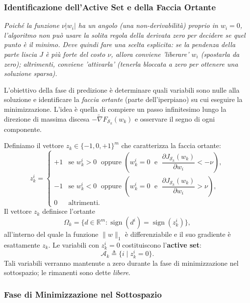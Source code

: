 \documentclass[a4paper,12pt]{article}
\numberwithin{equation}{section}
\numberwithin{figure}{section}
\numberwithin{table}{section}
\begin{document}
\subsubsection{Identificazione dell'Active Set e della Faccia Ortante}
\textit{Poiché la funzione \(\nu|w_i|\) ha un angolo (una non-derivabilità) proprio in \(w_i = 0\), l'algoritmo non può usare la solita regola della derivata zero per decidere se quel punto è il minimo. Deve quindi fare una scelta esplicita: se la pendenza della parte liscia \(J\) è più forte del costo \(\nu\), allora conviene 'liberare' \(w_i\) (spostarla da zero); altrimenti, conviene 'attivarla' (tenerla bloccata a zero per ottenere una soluzione sparsa).}

L'obiettivo della fase di predizione è determinare quali variabili sono nulle
alla soluzione e identificare la \emph{faccia ortante} (parte dell'iperpiano) su cui eseguire la
minimizzazione. L'idea è quella di compiere un passo infinitesimo lungo la
direzione di massima discesa $-\widetilde{\nabla}F_{\mathcal{S}_k}(w_k)$ e
osservare il segno di ogni componente.

Definiamo il vettore $z_k \in \{-1,0,+1\}^m$ che caratterizza la faccia ortante:
\begin{equation}
z_k^i =
\begin{cases}
+1 & \text{se } w_k^i > 0 \;\text{ oppure } \left( w_k^i = 0 \;\text{ e }\; \dfrac{\partial J_{\mathcal{S}_k}(w_k)}{\partial w_i} < -\nu \right), \\[12pt]
-1 & \text{se } w_k^i < 0 \;\text{ oppure } \left( w_k^i = 0 \;\text{ e }\; \dfrac{\partial J_{\mathcal{S}_k}(w_k)}{\partial w_i} > \nu \right), \\[12pt]
0 & \text{altrimenti}.
\end{cases} \tag{5.44}
\end{equation}
Il vettore $z_k$ definisce l'ortante
\[
\Omega_k = \{ d \in \mathbb{R}^m : \operatorname{sign}(d^i) = \operatorname{sign}(z_k^i) \}, \tag{5.45}
\]
all'interno del quale la funzione $\|w\|_1$ è differenziabile e il suo gradiente
è esattamente $z_k$. Le variabili con $z_k^i = 0$ costituiscono l'\textbf{active
set}:
\begin{equation}
\mathcal{A}_k \triangleq \{ i \mid z_k^i = 0 \}. \tag{5.46}
\end{equation}
Tali variabili verranno mantenute a zero durante la fase di minimizzazione nel
sottospazio; le rimanenti sono dette \emph{libere}.


\subsubsection{Fase di Minimizzazione nel Sottospazio}
\end{document}
